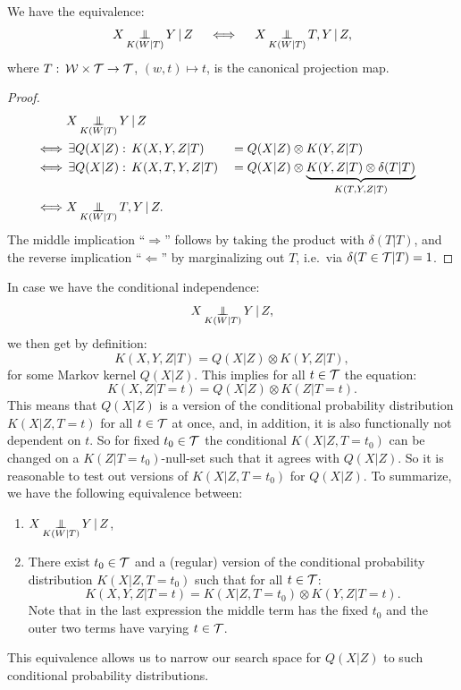\begin{Rem}
    \label{add-T}
 We have the equivalence:
 \[X \operatorname*{\perp\mkern-11mu\perp}_{K(W|T) } Y \operatorname*{|} Z \quad\iff \quad X \operatorname*{\perp\mkern-11mu\perp}_{K(W|T)} T,Y \operatorname*{|} Z,\]
where $T :\, \mathcal{W} \times \mathcal{T} \to \mathcal{T}$, $(w,t) \mapsto t$, is the canonical projection map.
\begin{proof}
\begin{align*}
&X \operatorname*{\perp\mkern-11mu\perp}_{K(W|T)} Y \operatorname*{|} Z \\
\iff &\, \exists Q(X|Z):\, K(X,Y,Z|T) &&= Q(X|Z) \otimes K(Y,Z|T)\\
\iff &\, \exists Q(X|Z):\, K(X,T,Y,Z|T) &&= Q(X|Z)\otimes \underbrace{ K(Y,Z|T)  \otimes  \delta(T|T)  }_{K(T,Y,Z|T)}\\
\iff& X \operatorname*{\perp\mkern-11mu\perp}_{K(W|T)} T,Y \operatorname*{|} Z.
\end{align*}
The middle implication ``$\Longrightarrow$'' follows by taking the product with $\delta(T|T)$, 
and the reverse implication ``$\Longleftarrow$'' by marginalizing out $T$, i.e.\ via $\delta(T \in \mathcal{T}|T)=1$.
\end{proof}
\end{Rem}


\begin{Rem}
 In case we have the conditional independence:
 \[X \operatorname*{\perp\mkern-11mu\perp}_{K(W|T)} Y \operatorname*{|} Z, \]
  we then get by definition:
 \[ K(X,Y,Z|T) = Q(X|Z)\otimes K(Y,Z|T),\]
 for some Markov kernel $Q(X|Z)$. This implies for all $t \in \mathcal{T}$ the equation:
\[ K(X,Z|T=t) = Q(X|Z)\otimes K(Z|T=t).\]
This means that  $Q(X|Z)$ is a version of the conditional probability distribution $K(X|Z,T=t)$ 
for all $t \in \mathcal{T}$ at once, and, in addition, it is also functionally not dependent on $t$. 
So for fixed $t_0 \in \mathcal{T}$ the conditional $K(X|Z,T=t_0)$ can be changed on a $K(Z|T=t_0)$-null-set such that it agrees with $Q(X|Z)$.
So it is reasonable to test out versions of $K(X|Z,T=t_0)$ for $Q(X|Z)$. 
To summarize, we have the following equivalence between:
\begin{enumerate}
    \item $\displaystyle X \operatorname*{\perp\mkern-11mu\perp}_{K(W|T)} Y \operatorname*{|} Z$,
    \item There exist $t_0 \in \mathcal{T}$ and a (regular) version of the conditional probability distribution 
        $K(X|Z,T=t_0)$ such that for all $t \in \mathcal{T}$: 
            \[ K(X,Y,Z|T=t) = K(X|Z,T=t_0)\otimes K(Y,Z|T=t). \]
       Note that in the last expression the middle term has the fixed $t_0$ and the outer two terms have varying $t \in \mathcal{T}$.
\end{enumerate}
This equivalence allows us to narrow our search space for $Q(X|Z)$ to such conditional probability distributions.
\end{Rem}


